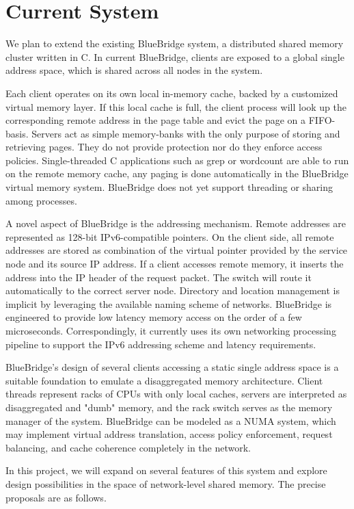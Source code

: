 \section{Current System}
\label{sec:current}
We plan to extend the existing BlueBridge system, a distributed shared memory
cluster written in C. In current BlueBridge, clients are exposed to a global
single address space, which is shared across all nodes in the system.

Each client operates on its own local in-memory cache, backed by a customized
virtual memory layer. If this local cache is full, the client process will look
up the corresponding remote address in the page table and evict the page on a
FIFO-basis. Servers act as simple memory-banks with the only purpose of storing
and retrieving pages. They do not provide protection nor do they enforce access
policies. Single-threaded C applications such as grep or wordcount are able to
run on the remote memory cache, any paging is done automatically in the
BlueBridge virtual memory system. BlueBridge does not yet support threading or
sharing among processes.

A novel aspect of BlueBridge is the addressing mechanism. Remote addresses are
represented as 128-bit IPv6-compatible pointers. On the client side, all remote
addresses are stored as combination of the virtual pointer provided by the
service node and its source IP address. If a client accesses remote memory, it
inserts the address into the IP header of the request packet. The switch will
route it automatically to the correct server node. Directory and location
management is implicit by leveraging the available naming scheme of networks.
BlueBridge is engineered to provide low latency memory access on the order of a
few microseconds. Correspondingly, it currently uses its own networking
processing pipeline to support the IPv6 addressing scheme and latency
requirements.

BlueBridge's design of several clients accessing a static single address space
is a suitable foundation to emulate a disaggregated memory architecture. Client
threads represent racks of CPUs with only local caches, servers are interpreted
as disaggregated and "dumb" memory, and the rack switch serves as the memory
manager of the system.
BlueBridge can be modeled as a NUMA system, which may implement virtual address
translation, access policy enforcement, request balancing, and cache coherence
completely in the network.

In this project, we will expand on several features of this system and explore
design possibilities in the space of network-level shared memory. The precise
proposals are as follows.
